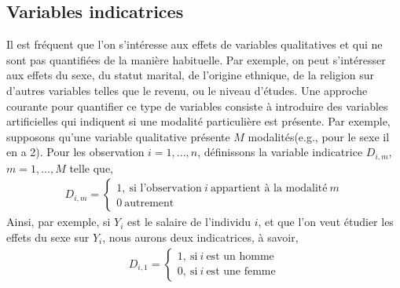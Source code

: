\documentclass[10pt, reqno]{amsart}
\begin{document}
\subsection{Variables indicatrices}
Il est fréquent que l'on s'intéresse aux effets de variables qualitatives et qui ne sont pas quantifiées de la manière habituelle. Par exemple, on peut s'intéresser aux effets du sexe, du statut marital, de l'origine ethnique, de la religion sur d'autres variables telles que le revenu, ou le niveau d'études. Une approche courante pour quantifier ce type de variables consiste à introduire des variables artificielles qui indiquent si une modalité particulière est présente. Par exemple, supposons qu'une variable qualitative présente $M$ modalités(e.g., pour le sexe il en a 2). Pour les observation $i=1,...,n$, définissons la variable indicatrice $D_{i,m}$, $m=1,...,M$ telle que,
\begin{align*}
D_{i, m} = \left\{
\begin{array}{c}
1, \  \textrm{si l'observation} \  i  \ \textrm{appartient à la  modalité} \ m\\
0 \  \textrm{autrement}
\end{array}
\right.
\end{align*}
Ainsi, par exemple, si $Y_i$ est le salaire de l'individu $i$, et que l'on veut étudier les effets du sexe sur $Y_i$, nous aurons deux indicatrices, à savoir,
\begin{align*}
D_{i, 1} = \left\{
\begin{array}{c}
1, \  \textrm{si} \  i  \ \textrm{est un homme}\\
0, \  \textrm{si} \  i  \ \textrm{est une femme}
\end{array}
\right.
\end{align*}
\end{document}

